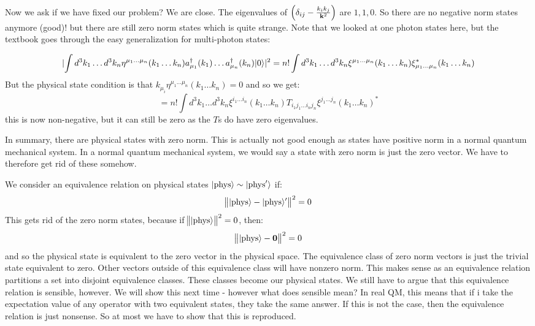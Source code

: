 Now we ask if we have fixed our problem? We are close. The eigenvalues of $\left(\delta_{ij} - \frac{k_ik_j}{\mathbf{k}^2}\right)$ are $1, 1, 0$. So there are no negative norm states anymore (good)! but there are still zero norm states which is quite strange. Note that we looked at one photon states here, but the textbook goes through the easy generalization for multi-photon states:

\begin{equation}
    \lvert \int d^3k_1 \ldots d^3k_n \eta^{\mu_1 \ldots \mu_n}(k_1 \ldots k_n) a^\dagger_{\mu_1}(k_1) \ldots a^\dagger_{\mu_n}(k_n)\lvert 0 \rangle \rvert^2 = n!\int d^3 k_1 \ldots d^3k_n \xi^{\mu_1 \ldots \mu_n}(k_1 \ldots k_n)\xi^*_{\mu_1 \ldots \mu_n}(k_1 \ldots k_n)
\end{equation}
But the physical state condition is that $k_{\mu_i}\eta^{\mu_1 \ldots \mu_n}(k_1 \ldots k_n) = 0$ and so we get:
\begin{equation}
    = n!\int d^3 k_1 \ldots d^3 k_n \xi^{i_1 \ldots i_n}(k_1 \ldots k_n)T_{i_1j_1\ldots i_nj_n}\xi^{j_1 \ldots j_n}(k_1 \ldots k_n)^*
\end{equation}
this is now non-negative, but it can still be zero as the $T$s do have zero eigenvalues.

In summary, there are physical states with zero norm. This is actually not good enough as states have positive norm in a normal quantum mechanical system. In a normal quantum mechanical system, we would say a state with zero norm is just the zero vector. We have to therefore get rid of these somehow.

We consider an equivalence relation on physical states $\lvert \text{phys} \rangle \sim \lvert \text{phys}' \rangle$ if:
\begin{equation}
    \norm{\lvert \text{phys} \rangle - \lvert \text{phys} \rangle'}^2 = 0
\end{equation}
This gets rid of the zero norm states, because if $\norm{\lvert \text{phys} \rangle}^2 = 0$, then:
\begin{equation}
    \norm{\lvert \text{phys} \rangle - \mathbf{0}}^2 = 0
\end{equation}
and so the physical state is equivalent to the zero vector in the physical space. The equivalence class of zero norm vectors is just the trivial state equivalent to zero. Other vectors outside of this equivalence class will have nonzero norm. This makes sense as an equivalence relation partitions a set into disjoint equivalence classes. These classes become our physical states. We still have to argue that this equivalence relation is sensible, however. We will show this next time - however what does sensible mean? In real QM, this means that if i take the expectation value of any operator with two equivalent states, they take the same answer. If this is not the case, then the equivalence relation is just nonsense. So at most we have to show that this is reproduced.